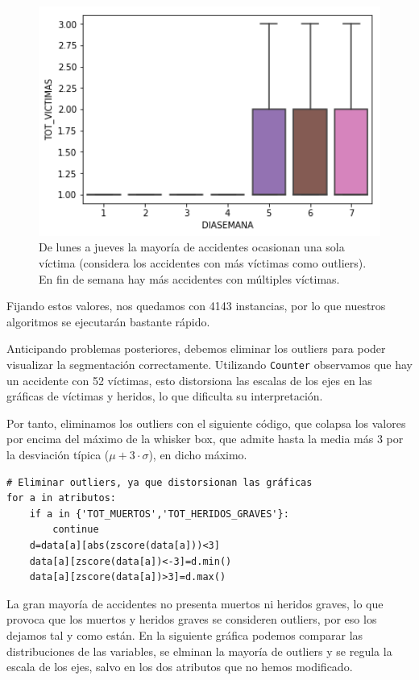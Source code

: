 \documentclass[oneside]{book}
\begin{document}
\begin{figure}[H]
  \centering
  \includegraphics[width=140mm]{figures/accidentes/diasemana}
  \caption{De lunes a jueves la mayoría de accidentes ocasionan una
    sola víctima (considera los accidentes con más víctimas como
    outliers). En fin de semana hay más accidentes con múltiples
    víctimas.}
  \label{fig:diasemana}
\end{figure}
\vspace{-5mm}
Fijando estos valores, nos quedamos con 4143 instancias, por lo que
nuestros algoritmos se ejecutarán bastante rápido.

Anticipando problemas posteriores, debemos eliminar los outliers para
poder visualizar la segmentación correctamente. Utilizando
\texttt{Counter} observamos que hay un accidente con 52 víctimas, esto
distorsiona las escalas de los ejes en las gráficas de víctimas y
heridos, lo que dificulta su interpretación.

Por tanto, eliminamos los outliers con el siguiente código, que
colapsa los valores por encima del máximo de la whisker box, que
admite hasta la media más 3 por la desviación típica
($\mu+3\cdot\sigma$), en dicho máximo.

\begin{verbatim}
# Eliminar outliers, ya que distorsionan las gráficas
for a in atributos:
    if a in {'TOT_MUERTOS','TOT_HERIDOS_GRAVES'}:
        continue
    d=data[a][abs(zscore(data[a]))<3]
    data[a][zscore(data[a])<-3]=d.min()
    data[a][zscore(data[a])>3]=d.max()
\end{verbatim}

La gran mayoría de accidentes no presenta muertos ni heridos graves,
lo que provoca que los muertos y heridos graves se consideren
outliers, por eso los dejamos tal y como están. En la siguiente
gráfica podemos comparar las distribuciones de las variables, se
elminan la mayoría de outliers y se regula la escala de los ejes,
salvo en los dos atributos que no hemos modificado.
\end{document}
